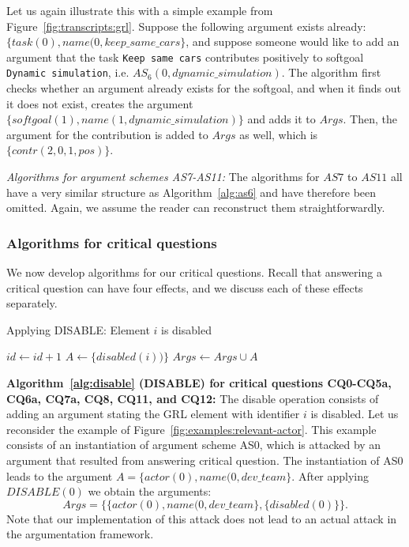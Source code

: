 Let us again illustrate this with a simple example from Figure~\ref{fig:transcripts:grl}. Suppose the following argument exists already: $\{task(0),name(0,keep\_same\_cars\}$, and suppose someone would like to add an argument that the task \texttt{Keep same cars} contributes positively to softgoal \texttt{Dynamic simulation}, i.e. $AS_6(0,dynamic\_simulation)$. The algorithm first checks whether an argument already exists for the softgoal, and when it finds out it does not exist, creates the argument $\{softgoal(1),name(1,dynamic\_simulation)\}$ and adds it to $Args$. Then, the argument for the contribution is added to $Args$ as well, which is $\{contr(2,0,1,pos)\}$.

\emph{Algorithms for argument schemes AS7-AS11:} 
The algorithms for $AS7$ to $AS11$ all have a very similar structure as Algorithm~\ref{alg:as6} and have therefore been omitted. Again, we assume the reader can reconstruct them straightforwardly.

\subsubsection*{Algorithms for critical questions}

We now develop algorithms for our critical questions.  Recall that answering a critical question can have four effects, and we discuss each of these effects separately.

\begin{algorithm}[h]
  \caption{Applying DISABLE: Element $i$ is disabled}\label{alg:disable}
  \begin{algorithmic}[1]
    \State $id\gets id+1$
    \State $A\gets \{disabled(i))\}$
    \State $Args \gets Args\cup A$
    \EndProcedure
  \end{algorithmic}
\end{algorithm}

\noindent\textbf{Algorithm~\ref{alg:disable} (\textsf{DISABLE}) for critical questions CQ0-CQ5a, CQ6a, CQ7a, CQ8, CQ11, and CQ12:} 
The disable operation consists of adding an argument stating the GRL element with identifier $i$ is disabled. Let us reconsider the example of Figure~\ref{fig:examples:relevant-actor}. This example consists of an instantiation of argument scheme AS0, which is attacked by an argument that resulted from answering critical question. The instantiation of AS0 leads to the argument $A=\{actor(0),name(0,dev\_team\}$. After applying $DISABLE(0)$ we obtain the arguments: $$Args=\{\{actor(0),name(0,dev\_team\}, \{disabled(0)\}\}.$$ Note that our implementation of this attack does not lead to an actual attack in the argumentation framework.

